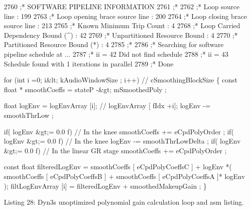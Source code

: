 \begin{DoxyCode}
2760 ;* SOFTWARE PIPELINE INFORMATION
2761 ;*
2762 ;* Loop source line : 199
2763 ;* Loop opening brace source line : 200
2764 ;* Loop closing brace source line : 213
2765 ;* Known Minimum Trip Count : 4
2768 ;* Loop Carried Dependency Bound (^) : 42
2769 ;* Unpartitioned Resource Bound : 4
2770 ;* Partitioned Resource Bound (*) : 4
2785 ;*
2786 ;* Searching \textcolor{keywordflow}{for} software pipeline schedule at ...
2787 ;* ii = 42 Did not find schedule
2788 ;* ii = 43 Schedule found with 1 iterations in parallel
2789 ;* Done

\textcolor{keywordflow}{for} (\textcolor{keywordtype}{int} i =0; i&lt; kAudioWindowSize ; i++) \textcolor{comment}{// cSmoothingBlockSize}
\{
    \textcolor{keyword}{const} \textcolor{keywordtype}{float} * smoothCoeffs = stateP -&gt; mSmoothedPoly ;

    \textcolor{keywordtype}{float} logEnv = logEnvArray [i]; \textcolor{comment}{// logEnvArray [ fIdx +i];}
    logEnv -= smoothThrLow ;

    \textcolor{keywordflow}{if}( logEnv &gt;= 0.0 f) \textcolor{comment}{// In the knee}
        smoothCoeffs += eCpdPolyOrder ;
    \textcolor{keywordflow}{if}( logEnv &gt;= 0.0 f) \textcolor{comment}{// In the knee}
        logEnv -= smoothThrLowDelta ;
    \textcolor{keywordflow}{if}( logEnv &gt;= 0.0 f) \textcolor{comment}{// In the linear GR stage}
        smoothCoeffs += eCpdPolyOrder ;

    \textcolor{keyword}{const} \textcolor{keywordtype}{float} filteredLogEnv = smoothCoeffs [ eCpdPolyCoeffsC ] +
        logEnv *( smoothCoeffs [ eCpdPolyCoeffsB ] +
        smoothCoeffs [ eCpdPolyCoeffsA ]* logEnv );
    filtLogEnvArray [i] = filteredLogEnv + smoothedMakeupGain ;
\} 
\end{DoxyCode}
  Listing 28\+: Dyn3\textquotesingle{}s unoptimized polynomial gain calculation loop and asm listing.



